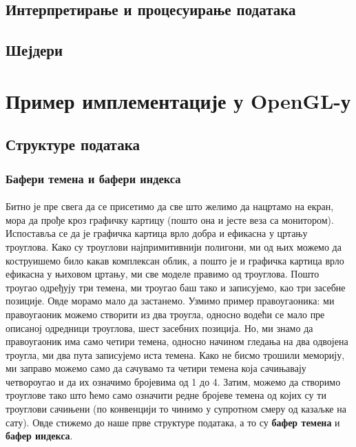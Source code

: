 \documentclass[12pt]{article}
\begin{document}
	\subsection{Интерпретирање и процесуирање података}
	\paragraph{}
	
	\subsection{Шејдери}
	\paragraph{}
	
	\section{Пример имплементације у OpenGL-у}
	
	\subsection{Структуре података}
	
	\subsubsection{Бафери темена и бафери индекса}
	\paragraph{}
	Битно је пре свега да се присетимо да све што желимо да нацртамо на екран, мора да прође кроз графичку картицу (пошто она и јесте веза са монитором). Испоставља се да је графичка картица врло добра и ефикасна у цртању троуглова. Како су троуглови најпримитивнији полигони, ми од њих можемо да коструишемо било какав комплексан облик, а пошто је и графичка картица врло ефикасна у њиховом цртању, ми све моделе правимо од троуглова. Пошто троугао одређују три темена, ми троугао баш тако и записујемо, као три засебне позиције. Овде морамо мало да застанемо. Узмимо пример правоугаоника: ми правоугаоник можемо створити из два троугла, односно водећи се мало пре описаној одредници троуглова, шест засебних позиција. Но, ми знамо да правоугаоник има само четири темена, односно начином гледања на два одвојена троугла,  ми два пута записујемо иста темена. Како не бисмо трошили меморију, ми заправо можемо само да сачувамо та четири темена која сачињавају четвороугао и да их означимо бројевима од 1 до 4. Затим, можемо да створимо троуглове тако што ћемо само означити редне бројеве темена од којих су ти троуглови сачињени (по конвенцији то чинимо у супротном смеру од казаљке на сату). Овде стижемо до наше прве структуре података, а то су \textbf{бафер темена} и \textbf{бафер индекса}.
\end{document}
